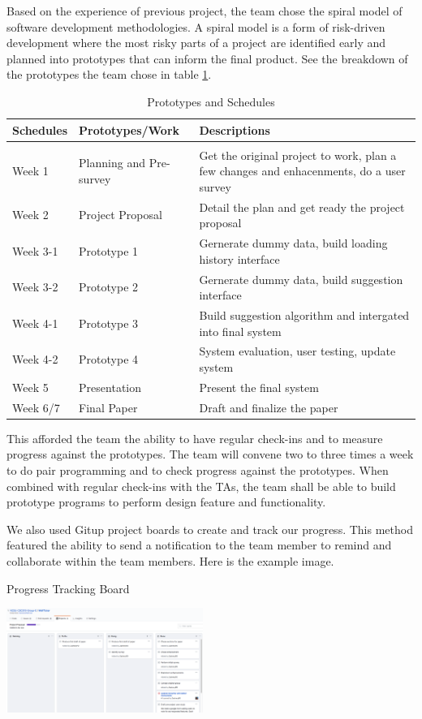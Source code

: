 Based on the experience of previous project, the team chose the spiral model
of software development methodologies. A spiral model is a form of 
risk-driven development where the most risky parts of a project are 
identified early and planned into prototypes that can inform the final 
product. See the breakdown of the prototypes the team chose in table \ref{sec:progress:prototypes-table}.

\begin{table}[!htbp]
\caption{Prototypes and Schedules}
\label{sec:progress:prototypes-table}
\begin{center}
\begin{tabular}{  l  l p{10cm} }
	\bf Schedules & \bf Prototypes/Work & \bf Descriptions\\ \hline \\
	Week 1 & Planning and Pre-survey & Get the original project to work, plan a few changes and enhacenments, do a user survey\\
	Week 2 & Project Proposal & Detail the plan and get ready the project proposal\\
	Week 3-1 & Prototype 1 & Gernerate dummy data, build loading history interface\\
	Week 3-2 & Prototype 2 & Gernerate dummy data, build suggestion interface\\
	Week 4-1 & Prototype 3 & Build suggestion algorithm and intergated into final system \\
	Week 4-2 & Prototype 4 & System evaluation, user testing, update system \\
	Week 5 & Presentation & Present the final system \\
	Week 6/7 & Final Paper & Draft and finalize the paper \\
\end{tabular}
\end{center}
\end{table}


This afforded the team the ability to have regular check-ins and to measure
progress against the prototypes. The team will convene two to three times 
a week to do pair programming and to check progress against the prototypes.
When combined with regular check-ins with the TAs, the team shall be able 
to build prototype programs to perform design feature and functionality.

We also used Gitup project boards to create and track our progress. This 
method featured the ability to send a notification to the team member to 
remind and collaborate within the team members. Here is the example image.

\begin{table}[ht]
\caption{Progress Tracking Board}
\label{section:progress:tracking-board}
\centering
\includegraphics[width=0.48\textwidth]{progress_tracking.png}
\end{table}